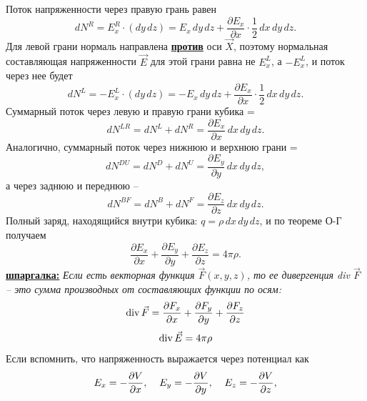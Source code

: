 Поток напряженности через правую грань равен
 \begin{displaymath}
  dN^R=E_x^R\cdot (dy\,dz)= E_x\,dy\,dz+\frac{\partial E_x}{\partial x}\cdot\frac12\,dx\,dy\,dz.
 \end{displaymath}
Для левой грани нормаль направлена \underline{\bf против} оси $\vec{X}$, поэтому нормальная составляющая напряженности $\vec{E}$ для этой грани равна не $E_x^L$, а $-E_x^L$, и поток через нее будет\vspace{-3mm}
 \begin{displaymath}
  dN^L=-E_x^L\cdot (dy\,dz)= -E_x\,dy\,dz+\frac{\partial E_x}{\partial x}\cdot\frac12\,dx\,dy\,dz.
 \end{displaymath}
Суммарный поток через левую и правую грани кубика =
 \begin{displaymath}
  dN^{LR}=dN^L+dN^R=\frac{\partial E_x}{\partial x}\,dx\,dy\,dz.
 \end{displaymath}
Аналогично, суммарный поток через нижнюю и верхнюю грани =
 \begin{displaymath}
  dN^{DU}=dN^D+dN^U=\frac{\partial E_y}{\partial y}\,dx\,dy\,dz,
 \end{displaymath}
а через заднюю и переднюю --\vspace{-3mm}
 \begin{displaymath}
  dN^{BF}=dN^B+dN^F=\frac{\partial E_z}{\partial z}\,dx\,dy\,dz.
 \end{displaymath}
Полный заряд, находящийся внутри кубика: $q=\rho\,dx\,dy\,dz$, и по теореме О-Г получаем
 \begin{displaymath}
  \frac{\partial E_x}{\partial x}+\frac{\partial E_y}{\partial y}+\frac{\partial E_z}{\partial z}=4\pi\rho.
 \end{displaymath}
{\small\color{blue}  \underline{\bf шпаргалка:} {\em Если есть векторная функция $\vec{F}(x,y,z)$, то ее дивергенция div $\vec{F}$ -- это сумма производных от составляющих функции по осям:
 \begin{displaymath}
  {\rm div}\,\vec{F}=\frac{\partial F_x}{\partial x}+
  \frac{\partial F_y}{\partial y}+
  \frac{\partial F_z}{\partial z}\vspace{-3mm}
 \end{displaymath}
}}
 \begin{displaymath}
  {\rm div}\,\vec{E}=4\pi\rho
 \end{displaymath}
Если вспомнить, что напряженность выражается через потенциал как
 \begin{displaymath}
  E_x=-\frac{\partial V}{\partial x},\;\;\;\;  E_y=-\frac{\partial V}{\partial y},\;\;\;\;  E_z=-\frac{\partial V}{\partial z},\vspace{3mm}
 \end{displaymath}
